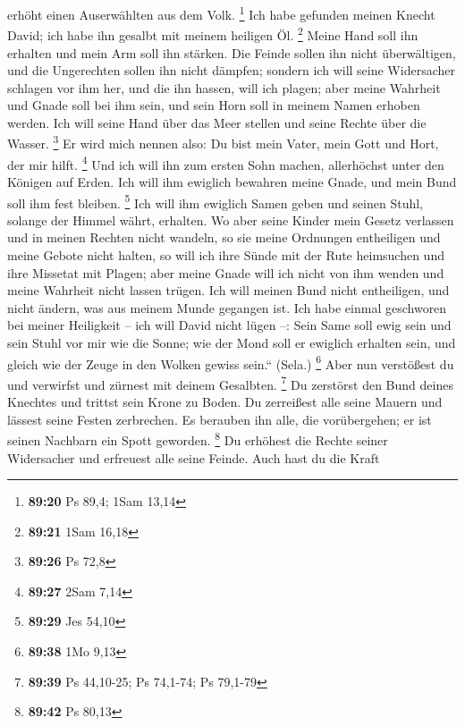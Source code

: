 erhöht einen Auserwählten aus dem Volk. \footnote{\textbf{89:20} Ps
  89,4; 1Sam 13,14}  Ich habe gefunden meinen Knecht
David; ich habe ihn gesalbt mit meinem heiligen Öl. \footnote{\textbf{89:21}
  1Sam 16,18}  Meine Hand soll ihn erhalten und mein Arm
soll ihn stärken.  Die Feinde sollen ihn nicht
überwältigen, und die Ungerechten sollen ihn nicht dämpfen;
 sondern ich will seine Widersacher schlagen vor ihm her,
und die ihn hassen, will ich plagen;  aber meine Wahrheit
und Gnade soll bei ihm sein, und sein Horn soll in meinem Namen erhoben
werden.  Ich will seine Hand über das Meer stellen und
seine Rechte über die Wasser. \footnote{\textbf{89:26} Ps 72,8}
 Er wird mich nennen also: Du bist mein Vater, mein Gott
und Hort, der mir hilft. \footnote{\textbf{89:27} 2Sam 7,14}
 Und ich will ihn zum ersten Sohn machen, allerhöchst
unter den Königen auf Erden.  Ich will ihm ewiglich
bewahren meine Gnade, und mein Bund soll ihm fest bleiben. \footnote{\textbf{89:29}
  Jes 54,10}  Ich will ihm ewiglich Samen geben und
seinen Stuhl, solange der Himmel währt, erhalten.  Wo
aber seine Kinder mein Gesetz verlassen und in meinen Rechten nicht
wandeln,  so sie meine Ordnungen entheiligen und meine
Gebote nicht halten,  so will ich ihre Sünde mit der Rute
heimsuchen und ihre Missetat mit Plagen;  aber meine
Gnade will ich nicht von ihm wenden und meine Wahrheit nicht lassen
trügen.  Ich will meinen Bund nicht entheiligen, und
nicht ändern, was aus meinem Munde gegangen ist.  Ich
habe einmal geschworen bei meiner Heiligkeit -- ich will David nicht
lügen --:  Sein Same soll ewig sein und sein Stuhl vor
mir wie die Sonne;  wie der Mond soll er ewiglich
erhalten sein, und gleich wie der Zeuge in den Wolken gewiss sein.``
(Sela.) \footnote{\textbf{89:38} 1Mo 9,13}  Aber nun
verstößest du und verwirfst und zürnest mit deinem Gesalbten.
\footnote{\textbf{89:39} Ps 44,10-25; Ps 74,1-74; Ps 79,1-79}
 Du zerstörst den Bund deines Knechtes und trittst sein
Krone zu Boden.  Du zerreißest alle seine Mauern und
lässest seine Festen zerbrechen.  Es berauben ihn alle,
die vorübergehen; er ist seinen Nachbarn ein Spott geworden. \footnote{\textbf{89:42}
  Ps 80,13}  Du erhöhest die Rechte seiner Widersacher
und erfreuest alle seine Feinde.  Auch hast du die Kraft
